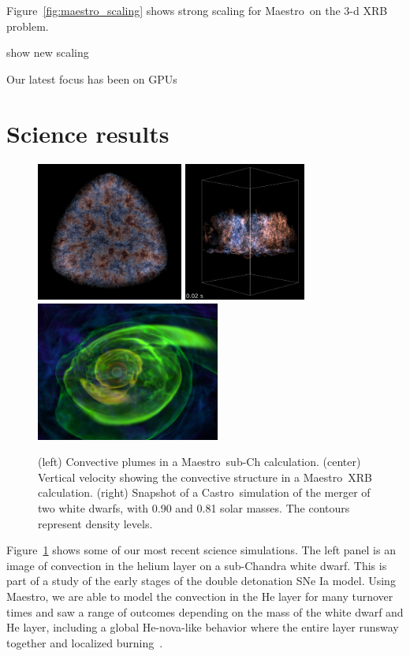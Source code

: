\documentclass[letterpaper]{jpconf}
\newcommand{\maestro}{{\sffamily Maestro}}
\newcommand{\castro}{{\sffamily Castro}}
\begin{document}
Figure~\ref{fig:maestro_scaling} shows strong scaling for \maestro\ on the 3-d
XRB problem.

show new scaling

Our latest focus has been on GPUs



\section{Science results}

\begin{figure}[t]
\centering
\includegraphics[height=1.8in]{subch_h}
\includegraphics[height=1.8in]{xrb_compact}
\includegraphics[height=1.8in]{wdmerger_08030_new}
\caption{\label{fig:current-runs} (left) Convective plumes in a
  \maestro\ sub-Ch calculation. (center) Vertical velocity showing the
  convective structure in a \maestro\ XRB calculation. (right)
  Snapshot of a \castro\ simulation of the merger of two white dwarfs,
  with 0.90 and 0.81 solar masses. The contours represent density
  levels.}
\end{figure}

Figure~\ref{fig:current-runs} shows some of our most recent science
simulations.  The left panel is an image of convection in the helium
layer on a sub-Chandra white dwarf.  This is part of a study of the
early stages of the double detonation SNe Ia model.  Using \maestro,
we are able to model the convection in the He layer for many turnover
times and saw a range of outcomes depending on the mass of the white
dwarf and He layer, including a global He-nova-like behavior where the
entire layer runsway together and localized
burning~\cite{subchandra2}.
\end{document}
